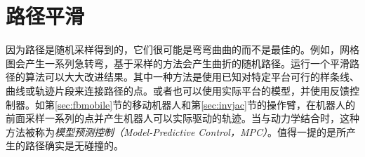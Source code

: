 \section{路径平滑}
因为路径是随机采样得到的，它们很可能是弯弯曲曲的而不是最佳的。例如，网格图会产生一系列急转弯，基于采样的方法会产生曲折的随机路径。运行一个平滑路径的算法可以大大改进结果。其中一种方法是使用已知对特定平台可行的样条线、曲线或轨迹片段来连接路径的点。或者也可以使用实际平台的模型，并使用反馈控制器。如第\ref{sec:fbmobile}节的移动机器人和第\ref{sec:invjac}节的操作臂，在机器人的前面采样一系列的点并产生机器人可以实际驱动的轨迹。当与动力学结合时，这种方法被称为\emph{模型预测控制（Model-Predictive Control，MPC）}。值得一提的是所产生的路径确实是无碰撞的。



